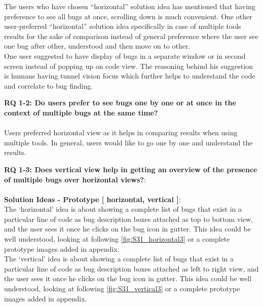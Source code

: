 The users who have chosen “horizontal” solution idea has mentioned that having preference to see all bugs at once, scrolling down is much convenient. One other user-preferred “horizontal” solution idea specifically in case of multiple tools results for the sake of comparison instead of general preference where the user see one bug after other, understood and then move on to other. \\

One user suggested to have display of bugs in a separate window or in second screen instead of popping up on code view. The reasoning behind his suggestion is humans having tunnel vision focus which further helps to understand the code and correlate to bug finding. \\

\clearpage 

\begin{myboxi}{{\textbf{RQ 1-2: Do users prefer to see bugs one by one or at once in the context of multiple bugs at the same time?}}}
	\\ \\ Users preferred horizontal view as it helps in comparing results when using multiple tools. In general, users would like to go one by one and understand the results.
\end{myboxi}
\hfill \break

\noindent \textbf{RQ 1-3: Does vertical view help in getting an overview of the presence of multiple bugs over horizontal views?}: \\ \\

\textbf{Solution Ideas - Prototype [ horizontal, vertical ]}: \\

The ‘horizontal’ idea is about showing a complete list of bugs that exist in a particular line of code as bug description boxes attached as top to bottom view, and the user sees it once he clicks on the bug icon in gutter. This idea could be well understood, looking at following \autoref{fig:S31_horizontal3} or a complete prototype images added in appendix. \\

The ‘vertical’ idea is about showing a complete list of bugs that exist in a particular line of code as bug description boxes attached as left to right view, and the user sees it once he clicks on the bug icon in gutter. This idea could be well understood, looking at following \autoref{fig:S31_vertical3} or a complete prototype images added in appendix. \\ \\ \\ \\ \\


